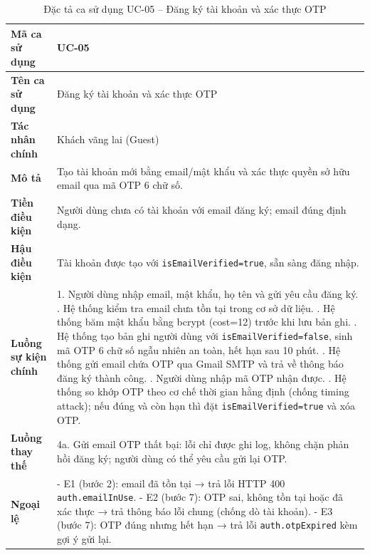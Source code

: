 \begin{longtable}{|p{3cm}|p{10.5cm}|}
  \caption{Đặc tả ca sử dụng UC-05 -- Đăng ký tài khoản và xác thực OTP}
  \label{tab:uc_spec_05} \\
  \hline
  \textbf{Mã ca sử dụng} & UC-05 \\ \hline
  \textbf{Tên ca sử dụng} & Đăng ký tài khoản và xác thực OTP \\ \hline
  \textbf{Tác nhân chính} & Khách vãng lai (Guest) \\ \hline
  \textbf{Mô tả} & Tạo tài khoản mới bằng email\slash mật khẩu và xác thực quyền sở hữu email qua mã OTP 6 chữ số. \\ \hline
  \textbf{Tiền điều kiện} & Người dùng chưa có tài khoản với email đăng ký; email đúng định dạng. \\ \hline
  \textbf{Hậu điều kiện} & Tài khoản được tạo với \texttt{isEmailVerified=true}, sẵn sàng đăng nhập. \\ \hline
  \textbf{Luồng sự kiện chính} &
  1. Người dùng nhập email, mật khẩu, họ tên và gửi yêu cầu đăng ký. \newline
  2. Hệ thống kiểm tra email chưa tồn tại trong cơ sở dữ liệu. \newline
  3. Hệ thống băm mật khẩu bằng bcrypt (cost=12) trước khi lưu bản ghi. \newline
  4. Hệ thống tạo bản ghi người dùng với \texttt{isEmailVerified=false}, sinh mã OTP 6 chữ số ngẫu nhiên an toàn, hết hạn sau 10 phút. \newline
  5. Hệ thống gửi email chứa OTP qua Gmail SMTP và trả về thông báo đăng ký thành công. \newline
  6. Người dùng nhập mã OTP nhận được. \newline
  7. Hệ thống so khớp OTP theo cơ chế thời gian hằng định (chống timing attack); nếu đúng và còn hạn thì đặt \texttt{isEmailVerified=true} và xóa OTP. \\ \hline
  \textbf{Luồng thay thế} & 4a. Gửi email OTP thất bại: lỗi chỉ được ghi log, không chặn phản hồi đăng ký; người dùng có thể yêu cầu gửi lại OTP. \\ \hline
  \textbf{Ngoại lệ} &
  - E1 (bước 2): email đã tồn tại → trả lỗi HTTP 400 \texttt{auth.emailInUse}. \newline
  - E2 (bước 7): OTP sai, không tồn tại hoặc đã xác thực → trả thông báo lỗi chung (chống dò tài khoản). \newline
  - E3 (bước 7): OTP đúng nhưng hết hạn → trả lỗi \texttt{auth.otpExpired} kèm gợi ý gửi lại. \\ \hline
\end{longtable}

